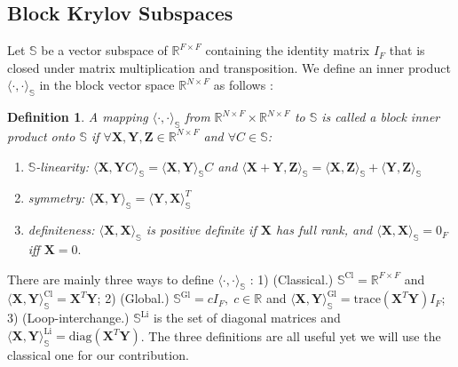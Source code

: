 \documentclass{article}
\newcommand\ie{\textit{i.e.}}
\newtheorem{definition}{Definition}
\begin{document}
\subsection{Block Krylov Subspaces}
Let $\mathbb{S}$ be a vector subspace of $\mathbb{R}^{F\times F}$ containing the identity matrix $I_F$ that is closed under matrix multiplication and transposition. We define an inner product $\langle\cdot, \cdot\rangle_{\mathbb{S}}$ in the block vector space $\mathbb{R}^{N \times F}$ as follows \cite{frommer2017block}:
\begin{definition}
A mapping $\langle\cdot, \cdot\rangle_{\mathbb{S}}$ from $\mathbb{R}^{N\times F} \times \mathbb{R}^{N\times F}$ to $\mathbb{S} $ is called a block inner product onto $\mathbb{S}$ if $\forall \bm{X, Y, Z} \in \mathbb{R}^{N\times F}$ and $\forall C \in \mathbb{S}$:
\begin{enumerate}[leftmargin=12pt]
\item $\mathbb{S}$-linearity: $\langle \bm{X}, \bm{Y}C \rangle_{\mathbb{S}} =  \langle \bm{X}, \bm{Y}\rangle_{\mathbb{S}}C$  and $ \langle \bm{X} + \bm{Y}, \bm{Z} \rangle_{\mathbb{S}} = \langle\bm{X}, \bm{Z}\rangle_{\mathbb{S}} + \langle \bm{Y}, \bm{Z}\rangle_{\mathbb{S}}$
\item symmetry: $ \langle \bm{X}, \bm{Y}\rangle_{\mathbb{S}} = \langle\bm{Y}, \bm{X}\rangle_{\mathbb{S}}^T $
\item definiteness: $ \langle \bm{X}, \bm{X}\rangle_{\mathbb{S}} $ is positive definite if $\bm{X}$ has full rank, and $ \langle \bm{X}, \bm{X}\rangle_{\mathbb{S}} = 0_F$ iff $\bm{X} = 0.$
\end{enumerate}
\end{definition}
	
There are mainly three ways to define $\langle\cdot, \cdot\rangle_{\mathbb{S}}$ \cite{frommer2017block}: 1) (Classical.) $\mathbb{S}^{\text{Cl}} = \mathbb{R}^{F\times F}$  and $ \langle \bm{X}, \bm{Y}\rangle_{\mathbb{S}}^{\text{Cl}}= \bm{X}^{T} \bm{Y}$; 2) (Global.) $\mathbb{S}^{\text{Gl}} = c I_F,\; c \in \mathbb{R} $   and $ \langle \bm{X}, \bm{Y}\rangle_{\mathbb{S}}^{\text{Gl}}= \text{trace}(\bm{X}^T \bm{Y}) I_F $; 3) (Loop-interchange.) $\mathbb{S}^{\text{Li}}$ is the set of diagonal matrices  and $ \langle \bm{X}, \bm{Y}\rangle_{\mathbb{S}}^{\text{Li}}= \text{diag}(\bm{X}^T \bm{Y})$. The three definitions are all useful yet we will use the classical one for our contribution.
\end{document}
